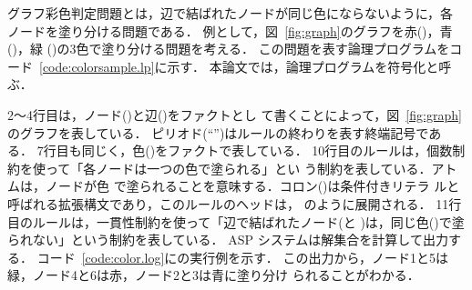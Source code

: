 グラフ彩色判定問題とは，辺で結ばれたノードが同じ色にならないように，各
ノードを塗り分ける問題である．
例として，図~\ref{fig:graph}のグラフを赤()，青()，緑
()の3色で塗り分ける問題を考える．
この問題を表す論理プログラムをコード~\ref{code:colorsample.lp}に示す．
本論文では，論理プログラムを符号化と呼ぶ．

2〜4行目は，ノード()と辺()をファクトとし
て書くことによって，図~\ref{fig:graph}のグラフを表している．
ピリオド(``'')はルールの終わりを表す終端記号である．
7行目も同じく，色()をファクトで表している．
%
10行目のルールは，個数制約を使って「各ノードは一つの色で塗られる」とい
う制約を表している．アトムは，ノードが色
で塗られることを意味する．コロン(\code{:})は条件付きリテラ
ルと呼ばれる拡張構文であり，このルールのヘッドは，
のように展開される．
11行目のルールは，一貫性制約を使って「辺で結ばれたノード(と
)は，同じ色()で塗られない」という制約を表している．
%
ASP システムは解集合を計算して出力する．
コード~\ref{code:color.log}に{\clingo}の実行例を示す．
この出力から，ノード1と5は緑，ノード4と6は赤，ノード2と3は青に塗り分け
られることがわかる．


